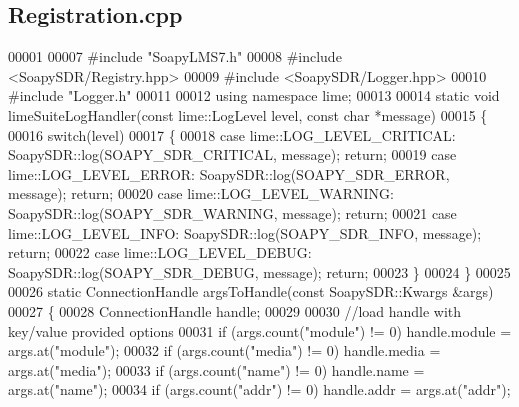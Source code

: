 \subsection{Registration.\+cpp}
\label{Registration_8cpp_source}

\begin{DoxyCode}
00001 
00007 \textcolor{preprocessor}{#include "SoapyLMS7.h"}
00008 \textcolor{preprocessor}{#include <SoapySDR/Registry.hpp>}
00009 \textcolor{preprocessor}{#include <SoapySDR/Logger.hpp>}
00010 \textcolor{preprocessor}{#include "Logger.h"}
00011 
00012 \textcolor{keyword}{using namespace }lime;
00013 
00014 \textcolor{keyword}{static} \textcolor{keywordtype}{void} limeSuiteLogHandler(\textcolor{keyword}{const} lime::LogLevel level, \textcolor{keyword}{const} \textcolor{keywordtype}{char} *message)
00015 \{
00016     \textcolor{keywordflow}{switch}(level)
00017     \{
00018     \textcolor{keywordflow}{case} lime::LOG_LEVEL_CRITICAL: SoapySDR::log(SOAPY_SDR_CRITICAL, message); \textcolor{keywordflow}{return};
00019     \textcolor{keywordflow}{case} lime::LOG_LEVEL_ERROR: SoapySDR::log(SOAPY_SDR_ERROR, message); \textcolor{keywordflow}{return};
00020     \textcolor{keywordflow}{case} lime::LOG_LEVEL_WARNING: SoapySDR::log(SOAPY_SDR_WARNING, message); \textcolor{keywordflow}{return};
00021     \textcolor{keywordflow}{case} lime::LOG_LEVEL_INFO: SoapySDR::log(SOAPY_SDR_INFO, message); \textcolor{keywordflow}{return};
00022     \textcolor{keywordflow}{case} lime::LOG_LEVEL_DEBUG: SoapySDR::log(SOAPY_SDR_DEBUG, message); \textcolor{keywordflow}{return};
00023     \}
00024 \}
00025 
00026 \textcolor{keyword}{static} ConnectionHandle argsToHandle(\textcolor{keyword}{const} SoapySDR::Kwargs &args)
00027 \{
00028     ConnectionHandle handle;
00029 
00030     \textcolor{comment}{//load handle with key/value provided options}
00031     \textcolor{keywordflow}{if} (args.count(\textcolor{stringliteral}{"module"}) != 0) handle.module = args.at(\textcolor{stringliteral}{"module"});
00032     \textcolor{keywordflow}{if} (args.count(\textcolor{stringliteral}{"media"}) != 0) handle.media = args.at(\textcolor{stringliteral}{"media"});
00033     \textcolor{keywordflow}{if} (args.count(\textcolor{stringliteral}{"name"}) != 0) handle.name = args.at(\textcolor{stringliteral}{"name"});
00034     \textcolor{keywordflow}{if} (args.count(\textcolor{stringliteral}{"addr"}) != 0) handle.addr = args.at(\textcolor{stringliteral}{"addr"});

\end{DoxyCode}
